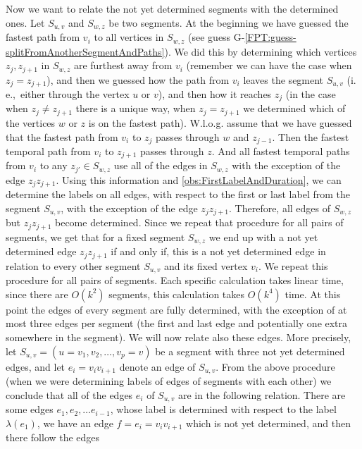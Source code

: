 \documentclass[11pt,a4paper]{article}
\theoremstyle{remark}
\theoremstyle{definition}
\newcommand{\ie}{i.\,e.,\ }
\begin{document}
Now we want to relate the not yet determined segments with the determined ones.
Let $S_{u,v}$ and $S_{w,z}$ be two segments.
At the beginning we have guessed the fastest path from $v_i$ to all vertices in $S_{w,z}$ (see guess G-\ref{FPT:guess-splitFromAnotherSegmentAndPaths}).
We did this by determining which vertices $z_j, z_{j+1}$ in $S_{w,z}$ are furthest away from $v_i$
(remember we can have the case when $z_j = z_{j+1}$),
and then we guessed how the path from $v_i$ leaves the segment $S_{u,v}$ (\ie either through the vertex $u$ or $v$),
and then how it reaches $z_j$ (in the case when $z_j \neq z_{j+1}$ there is a unique way,
when $z_j = z_{j+1}$ we determined which of the vertices $w$ or $z$ is on the fastest path).
W.l.o.g. assume that we have guessed that the fastest path from $v_i$ to $z_j$
passes through $w$ and $z_{j-1}$.
Then the fastest temporal path from $v_i$ to $z_{j+1}$ passes through $z$.
And all fastest temporal paths from $v_i$ to any $z_{j'} \in S_{w,z}$
use all of the edges in $S_{w,z}$ with the exception of the edge $z_j z_{j+1}$.
Using this information and \cref{obs:FirstLabelAndDuration}, we can determine the labels on all edges, with respect to the first or last label from the segment $S_{u,v}$,
with the exception of the edge $z_j z_{j+1}$.
Therefore, all edges of $S_{w,z}$ but $z_j z_{j+1}$ become determined.
Since we repeat that procedure for all pairs of segments,
we get that for a fixed segment $S_{w,z}$ we end up with a not yet determined edge $z_j z_{j+1}$
if and only if, this is a not yet determined edge in relation to every other segment $S_{u,v}$ and its fixed vertex $v_i$.
%
We repeat this procedure for all pairs of segments.
Each specific calculation takes linear time, since there are $O(k^2)$ segments, this calculation takes $O(k^4)$ time.
At this point
the edges of every segment are fully determined, 
with the exception of at most three edges per segment (the first and last edge and potentially one extra somewhere in the segment).
We will now relate also these edges.
More precisely,
let $S_{u,v} = (u=v_1, v_2, \dots, v_p=v)$ be a segment with three not yet determined edges,
and let $e_i =v_iv_{i+1}$ denote an edge of $S_{u,v}$.
From the above procedure (when we were determining labels of edges of segments with each other) 
we conclude that all of the edges $e_i$ of $S_{u,v}$ are in the following relation.
There are some edges $e_1, e_2, \dots e_{i-1}$, whose label is determined with respect to the label $\lambda(e_1)$,
we have an edge $f = e_i = v_i v_{i+1}$ which is not yet determined,
and then there follow the edges
\end{document}
